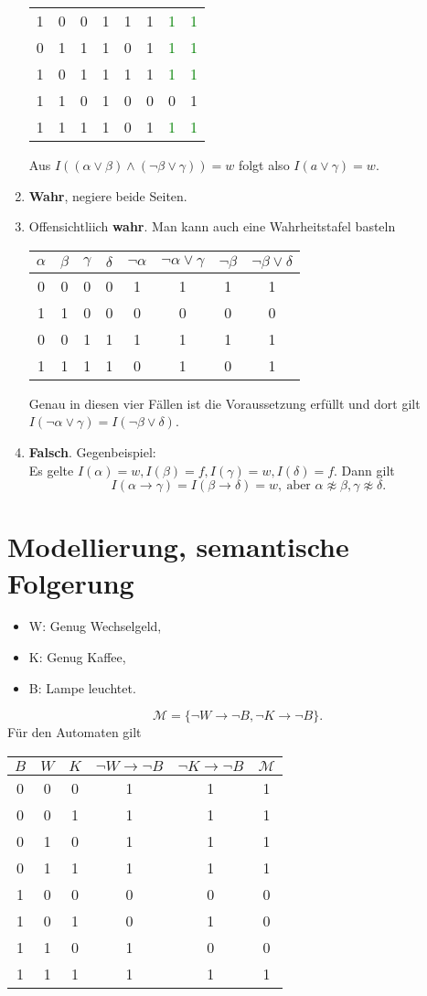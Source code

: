 \documentclass[a4paper]{article}
\begin{document}
\begin{enumerate}
\begin{center}
\begin{tabular}{c|c|c|c|c|c|c|c}
1&0&0&1&1&1&\textcolor{green}1&\textcolor{green}1\\
0&1&1&1&0&1&\textcolor{green}1&\textcolor{green}1\\
1&0&1&1&1&1&\textcolor{green}1&\textcolor{green}1\\
1&1&0&1&0&0&0&1\\
1&1&1&1&0&1&\textcolor{green}1&\textcolor{green}1
\end{tabular}
\end{center}
Aus $I((α\vee β)\wedge ( \neg β \vee γ )) = w$ folgt also $I(a\vee γ) = w$.
\item \textbf{Wahr}, negiere beide Seiten.
\item Offensichtliich \textbf{wahr}. Man kann auch eine Wahrheitstafel basteln
\begin{center}
\begin{tabular}{c|c|c|c|c|c|c|c}
$α$ & $β$ & $γ$ & $δ$ & $\neg α$ & $\neg α\vee γ $ & $\neg β$ & $\neg β \vee δ$\\ \hline
0&0&0&0&1&1&1&1\\
1&1&0&0&0&0&0&0\\
0&0&1&1&1&1&1&1\\
1&1&1&1&0&1&0&1
\end{tabular}
\end{center}
Genau in diesen vier Fällen ist die Voraussetzung erfüllt und dort gilt $I( \neg α\vee γ) = I(\neg β\vee δ)$.

\item \textbf{Falsch}. Gegenbeispiel:\\
Es gelte $I(α) = w, I(β) = f, I(γ) = w, I(δ) = f$. 
Dann gilt 
$$I(α\to γ) = I( β\to δ) = w,\ \text{aber $α\not \approx β, γ\not \approx δ$}.$$
\end{enumerate}

\section{Modellierung, semantische Folgerung}
\begin{itemize}
\item W: Genug Wechselgeld,
\item K: Genug Kaffee,
\item B: Lampe leuchtet.
\end{itemize}
$$\mathcal M = \{ \neg W \to \neg B, \neg K\to \neg B\}.$$
Für den Automaten gilt
\begin{center}
\begin{tabular}{c|c|c||c|c||c}
$B$ & $W$ & $K$ & $\neg W\to \neg B$ & $\neg K \to \neg B$ & $\mathcal M$\\ \hline
0&0&0&1&1&1\\
0&0&1&1&1&1\\
0&1&0&1&1&1\\
0&1&1&1&1&1\\
1&0&0&0&0&0\\
1&0&1&0&1&0\\
1&1&0&1&0&0\\
1&1&1&1&1&1
\end{tabular}
\end{center}
\end{document}
